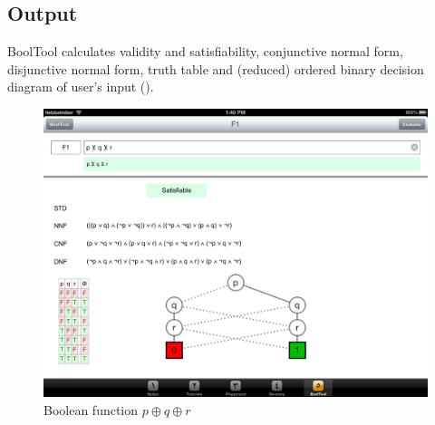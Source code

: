 
\subsection{Output}

BoolTool calculates validity and satisfiability, 
conjunctive normal form, 
disjunctive normal form, 
truth table and 
(reduced) ordered binary decision diagram 
of user's input (). 

\begin{figure}[htbp]
\begin{center}
\includegraphics[width=13cm]{concept/BoolTool.png}
\caption{Boolean function $p \oplus q \oplus r$}
\label{fig:BoolToolOutput}
\end{center}
\end{figure}



